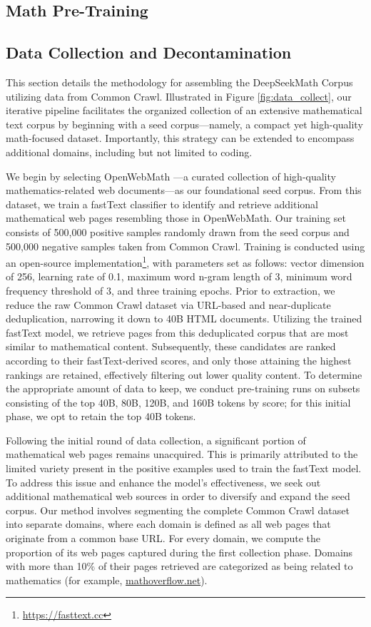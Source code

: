 \begin{itemize}[topsep=0pt]
\section{Math Pre-Training}

\subsection{Data Collection and Decontamination} This section details the methodology for assembling the DeepSeekMath Corpus utilizing data from Common Crawl. Illustrated in Figure \ref{fig:data_collect}, our iterative pipeline facilitates the organized collection of an extensive mathematical text corpus by beginning with a seed corpus—namely, a compact yet high-quality math-focused dataset. Importantly, this strategy can be extended to encompass additional domains, including but not limited to coding.

We begin by selecting OpenWebMath \citep{openwebmath}—a curated collection of high-quality mathematics-related web documents—as our foundational seed corpus. From this dataset, we train a fastText classifier \citep{joulin2016fasttext} to identify and retrieve additional mathematical web pages resembling those in OpenWebMath. Our training set consists of 500,000 positive samples randomly drawn from the seed corpus and 500,000 negative samples taken from Common Crawl. Training is conducted using an open-source implementation\footnote{\url{https://fasttext.cc}}, with parameters set as follows: vector dimension of 256, learning rate of 0.1, maximum word n-gram length of 3, minimum word frequency threshold of 3, and three training epochs. Prior to extraction, we reduce the raw Common Crawl dataset via URL-based and near-duplicate deduplication, narrowing it down to 40B HTML documents. Utilizing the trained fastText model, we retrieve pages from this deduplicated corpus that are most similar to mathematical content. Subsequently, these candidates are ranked according to their fastText-derived scores, and only those attaining the highest rankings are retained, effectively filtering out lower quality content. To determine the appropriate amount of data to keep, we conduct pre-training runs on subsets consisting of the top 40B, 80B, 120B, and 160B tokens by score; for this initial phase, we opt to retain the top 40B tokens.

Following the initial round of data collection, a significant portion of mathematical web pages remains unacquired. This is primarily attributed to the limited variety present in the positive examples used to train the fastText model. To address this issue and enhance the model's effectiveness, we seek out additional mathematical web sources in order to diversify and expand the seed corpus. Our method involves segmenting the complete Common Crawl dataset into separate domains, where each domain is defined as all web pages that originate from a common base URL. For every domain, we compute the proportion of its web pages captured during the first collection phase. Domains with more than 10\% of their pages retrieved are categorized as being related to mathematics (for example, \url{mathoverflow.net}).


\end{itemize}
